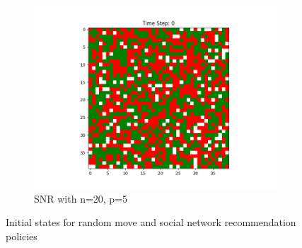 \documentclass[11pt]{article}
\begin{document}
\begin{figure}[h]
\begin{subfigure}{0.14\textwidth}
			\includegraphics[width=\linewidth]{initial_social_n20p5.png}
			\caption{\centering SNR with n=20, p=5}
		\end{subfigure}
		\caption{Initial states for random move and social network recommendation policies}
	\end{figure}
	\vspace{-1em} %
\end{document}
